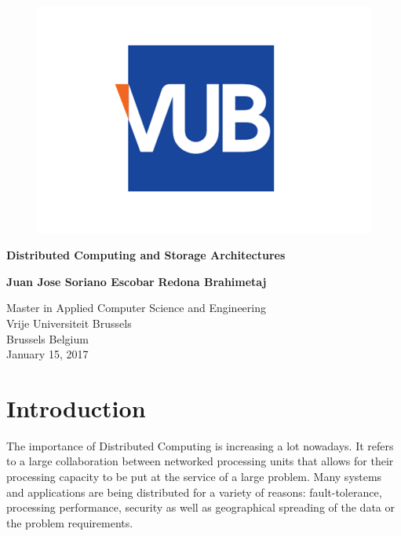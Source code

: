 \documentclass{article}
\begin{document}
    \begin{titlepage}
        \begin{center}
            \vspace*{1cm}
            \begin{figure}
                \centering
                \includegraphics[width=0.5\linewidth]{./img/vub.png}
            \end{figure}
            \Huge
            \textbf{Distributed Computing and Storage Architectures}
            
           
            
            \vspace{1.5cm}

            \textbf {\centering Juan Jose Soriano Escobar}
            \vspace{0.5cm}
            \newline
            \textbf{\centering Redona Brahimetaj}
            
            \vfill
            
            
            \Large
            Master in Applied Computer Science and Engineering\\
            Vrije Universiteit Brussels\\
            Brussels Belgium\\
            January 15, 2017
            
        \end{center}
    \end{titlepage}

    \tableofcontents
    \newpage

    \begin{appendix}
        \listoffigures
      \end{appendix}
      \newpage


        \section{Introduction}
        The importance of Distributed Computing is increasing a lot nowadays. It refers to a large collaboration between networked processing units that allows for their processing capacity to be put at the service of a large problem. Many systems and applications are being distributed for a variety of reasons: fault-tolerance, processing performance, security as well as geographical spreading of the data or the problem requirements. 
        
\end{document}
